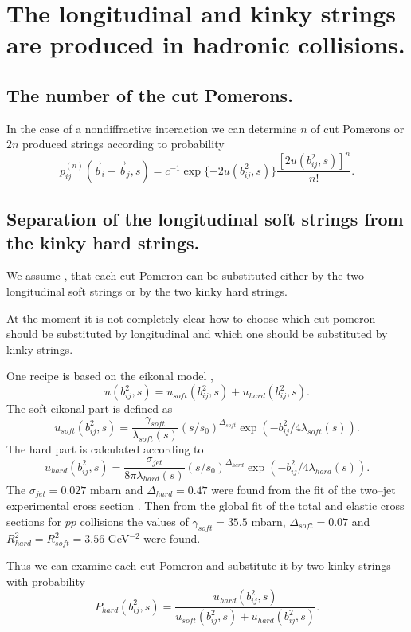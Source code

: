 \section{The longitudinal and kinky strings are produced 
in hadronic collisions.}

\subsection{The number of the cut Pomerons.}

\hspace{1.0em}In the case of a nondiffractive interaction we can
determine $n$ of cut Pomerons or $2n$ produced strings according to
probability \cite{AGK74}
\begin{equation}
\label{SLKS1}
 p^{(n)}_{ij}(\vec{ b}_i-\vec{ b}_j,s)
=c^{-1}\exp{\{-2u(b_{ij}^2,s)\}}
 \frac{[2u(b_{ij}^2,s)]^{n}}{n!}.
\end{equation}

\subsection{Separation of the longitudinal soft strings from 
 the kinky hard strings.}
 
\hspace{1.0em}We assume  \cite{ASGABP95}, \cite{WDFHO97} that each cut
Pomeron can be substituted either by the two longitudinal soft strings
or by the two kinky hard strings.

At the moment it is not completely clear how to choose which cut 
pomeron should be 
substituted by longitudinal and which one should be 
substituted by kinky strings.

One recipe is based on the eikonal model \cite{RCT94}, \cite{WDFHO97}
\begin{equation}
\label{SLKS2}u(b_{ij}^2,s)=u_{soft}(b_{ij}^2,s) + u_{hard}(b_{ij}^2,s).
\end{equation}
The soft eikonal part is defined as
\begin{equation}
\label{SLKS3}u_{soft}(b_{ij}^2,s) =
\frac{\gamma _{soft}}{\lambda_{soft} (s)}(s/s_0)^{\Delta_{soft}} 
\exp (-b_{ij}^2/4\lambda_{soft} (s)). 
\end{equation}
The hard part is calculated according to 
\begin{equation}
\label{SLKS4}u_{hard}(b_{ij}^2,s)=
\frac{\sigma_{jet}}{8\pi\lambda_{hard}(s)}
(s/s_0)^{\Delta_{hard}} 
\exp (-b_{ij}^2/4\lambda_{hard} (s)). 
\end{equation} 
The $\sigma_{jet}=0.027$ mbarn and $\Delta_{hard}=0.47$ were found from the fit of the two--jet 
experimental cross section \cite{UA1}. Then from the global fit of 
the total and
elastic cross sections for $pp$ collisions the values of $\gamma_{soft} = 35.5$ mbarn, $\Delta_{soft}=
0.07$ and $R^2_{hard} = R^2_{soft} = 3.56$ GeV$^{-2}$ were
found.

Thus we can examine each cut Pomeron and substitute it by two kinky
strings with probability
\begin{equation}
\label{SLKS5}
P_{hard}(b^2_{ij},s) = \frac{u_{hard}(b_{ij}^2,s)}{u_{soft}(b_{ij}^2,s)+ 
u_{hard}(b_{ij}^2,s)}.
\end{equation}

